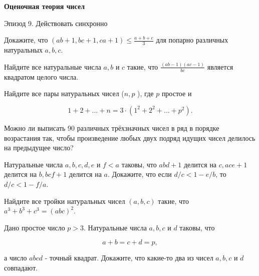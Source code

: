 \centerline{\bf \Huge Оценочная теория чисел}

\begin{flushright}
        \scriptsize{Эпизод 9. Действовать синхронно}
\end{flushright}

Докажите, что $(a b+1, b c+1, c a+1) \leqslant \frac{a+b+c}{3}$ для попарно различных натуральных $a, b, c$.

Найдите все натуральные числа $a, b$ и $c$ такие, что $\frac{(a b-1)(a c-1)}{b c}$ является квадратом целого числа.

Найдите все пары натуральных чисел ($n, p$ ), где $p$ простое и

$$
1+2+\ldots+n=3 \cdot\left(1^2+2^2+\ldots+p^2\right) .
$$


Можно ли выписать 90 различных трёхзначных чисел в ряд в порядке возрастания так, чтобы произведение любых двух подряд идущих чисел делилось на предыдущее число?

Натуральные числа $a, b, c, d, e$ и $f<a$ таковы, что $a b d+1$ делится на $c, a c e+1$ делится на $b, b c f+1$ делится на $a$. Докажите, что если $d / c<1-e / b$, то $d / c<1-f / a$.

Найдите все тройки натуральных чисел $(a, b, c)$ такие, что $a^3+b^3+c^3=(a b c)^2$.

Дано простое число $p>3$. Натуральные числа $a, b, c$ и $d$ таковы, что

$$
a+b=c+d=p,
$$


а число $a b c d$ - точный квадрат. Докажите, что какие-то два из чисел $a, b, c$ и $d$ совпадают.